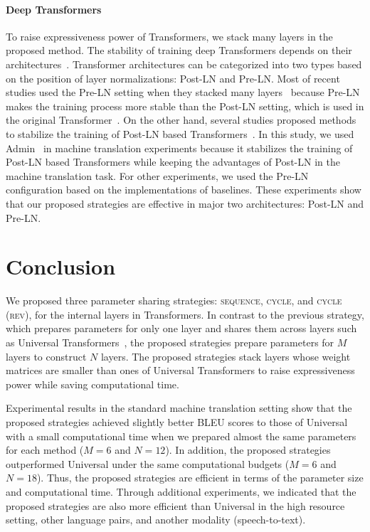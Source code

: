 \documentclass[11pt]{article}
\begin{document}
\paragraph{Deep Transformers}
To raise expressiveness power of Transformers, we stack many layers in the proposed method.
The stability of training deep Transformers depends on their architectures~\cite{iwslt-2019-transformer,layer-normalization-icml2020,liu-etal-2020-understanding}.
Transformer architectures can be categorized into two types based on the position of layer normalizations: Post-LN and Pre-LN.
Most of recent studies used the Pre-LN setting when they stacked many layers~\cite{wang-etal-2019-learning,NEURIPS2020_1457c0d6} because Pre-LN makes the training process more stable than the Post-LN setting, which is used in the original Transformer~\cite{iwslt-2019-transformer,layer-normalization-icml2020}.
On the other hand, several studies proposed methods to stabilize the training of Post-LN based Transformers~\cite{liu-etal-2020-understanding,takase:2022:b2t}.
In this study, we used Admin~\cite{liu-etal-2020-understanding} in machine translation experiments because it stabilizes the training of Post-LN based Transformers while keeping the advantages of Post-LN in the machine translation task.
For other experiments, we used the Pre-LN configuration based on the implementations of baselines.
These experiments show that our proposed strategies are effective in major two architectures: Post-LN and Pre-LN.


\section{Conclusion}
We proposed three parameter sharing strategies: \textsc{sequence}, \textsc{cycle}, and \textsc{cycle (rev)}, for the internal layers in Transformers.
In contrast to the previous strategy, which prepares parameters for only one layer and shares them across layers such as Universal Transformers~\cite{dehghani2019}, the proposed strategies prepare parameters for $M$ layers to construct $N$ layers.
The proposed strategies stack layers whose weight matrices are smaller than ones of Universal Transformers to raise expressiveness power while saving computational time.

Experimental results in the standard machine translation setting show that the proposed strategies achieved slightly better BLEU scores to those of Universal with a small computational time when we prepared almost the same parameters for each method ($M=6$ and $N=12$).
In addition, the proposed strategies outperformed Universal under the same computational budgets ($M=6$ and $N=18$).
Thus, the proposed strategies are efficient in terms of the parameter size and computational time.
Through additional experiments, we indicated that the proposed strategies are also more efficient than Universal in the high resource setting, other language pairs, and another modality (speech-to-text).
\end{document}
